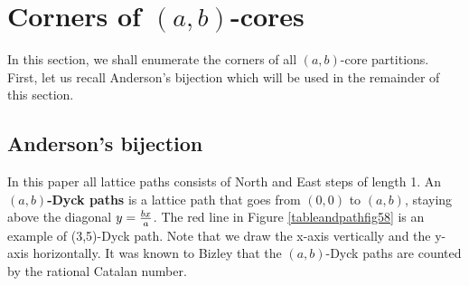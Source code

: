 \documentclass[a4paper,12pt]{article}
\begin{document}
\section{Corners of $(a,b)$-cores}

In this section, we shall enumerate the corners of all $(a,b)$-core partitions. First, let us recall Anderson's bijection which will be used in the remainder of this section.
%

\subsection{Anderson's bijection}


In this paper all lattice paths consists of North and East steps of length 1.
An \textbf{$(a,b)$-Dyck paths} is a lattice path  that goes from $(0,0)$ to $(a,b)$, staying above the diagonal $y={bx\over a}$.
The red line in Figure \ref{tableandpathfig58} is an example of  (3,5)-Dyck path. Note that we draw the x-axis vertically and the y-axis horizontally. %
It was known to Bizley \cite{biz54} that the $(a,b)$-Dyck paths are counted by the rational Catalan number.

%
%
%
%
%



%
%
\end{document}
